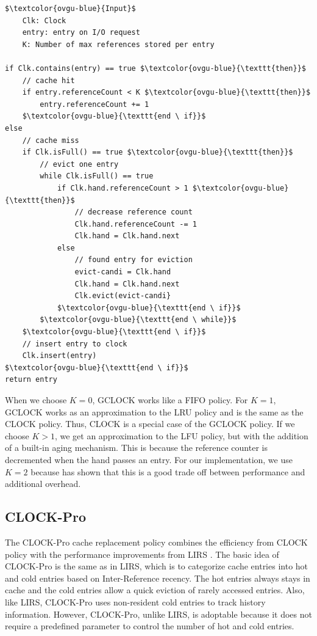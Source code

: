 \documentclass[
	12pt,
	a4paper,
	abstract,
	bibliography=totoc,
	chapterprefix,
	headings=openright,
	numbers=endperiod,
	parskip=half,
	twoside,
]{scrreprt}
\begin{document}
\begin{lstlisting}[mathescape=true,caption=GCLOCK replacement algorithm in pseudocode,label=lst:gclock-algorithm]
$\textcolor{ovgu-blue}{Input}$
	Clk: Clock
	entry: entry on I/O request
	K: Number of max references stored per entry

if Clk.contains(entry) == true $\textcolor{ovgu-blue}{\texttt{then}}$
	// cache hit
	if entry.referenceCount < K $\textcolor{ovgu-blue}{\texttt{then}}$
		entry.referenceCount += 1
	$\textcolor{ovgu-blue}{\texttt{end \ if}}$
else
	// cache miss
	if Clk.isFull() == true $\textcolor{ovgu-blue}{\texttt{then}}$
		// evict one entry
		while Clk.isFull() == true
			if Clk.hand.referenceCount > 1 $\textcolor{ovgu-blue}{\texttt{then}}$
				// decrease reference count 
				Clk.hand.referenceCount -= 1
				Clk.hand = Clk.hand.next
			else
				// found entry for eviction 
				evict-candi = Clk.hand
				Clk.hand = Clk.hand.next
				Clk.evict(evict-candi}
			$\textcolor{ovgu-blue}{\texttt{end \ if}}$
		$\textcolor{ovgu-blue}{\texttt{end \ while}}$
	$\textcolor{ovgu-blue}{\texttt{end \ if}}$
	// insert entry to clock
	Clk.insert(entry)
$\textcolor{ovgu-blue}{\texttt{end \ if}}$
return entry 
\end{lstlisting}

When we choose $K = 0$, GCLOCK works like a FIFO policy.
For $K = 1$, GCLOCK works as an approximation to the LRU policy and is the same as the CLOCK policy.
Thus, CLOCK is a special case of the GCLOCK policy.
If we choose $K > 1$, we get an approximation to the LFU policy, but with the addition of a built-in aging mechanism.
This is because the reference counter is decremented when the hand passes an entry.
For our implementation, we use $K = 2$ because \cite{corbato1968paging} has shown that this is a good trade off 
between performance and additional overhead.

\subsection{CLOCK-Pro}
\label{sub:clock-pro}

The CLOCK-Pro cache replacement policy \cite{jiang2005clock} combines the efficiency from CLOCK policy 
with the performance improvements from LIRS \cite{10.1145/511399.511340}.
The basic idea of CLOCK-Pro is the same as in LIRS, which is to categorize cache entries into hot and cold entries 
based on Inter-Reference recency.
The hot entries always stays in cache and the cold entries allow a quick eviction of rarely accessed entries.
Also, like LIRS, CLOCK-Pro uses non-resident cold entries to track history information.
However, CLOCK-Pro, unlike LIRS, is adoptable because it does not require a predefined parameter to control the number of hot and cold entries.
\end{document}
